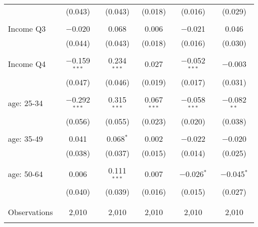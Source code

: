 \begin{tabular}{@{\extracolsep{5pt}}lccccc}
  & (0.043) & (0.043) & (0.018) & (0.016) & (0.029) \\ 
  & & & & & \\ 
 Income Q3 & $-$0.020 & 0.068 & 0.006 & $-$0.021 & 0.046 \\ 
  & (0.044) & (0.043) & (0.018) & (0.016) & (0.030) \\ 
  & & & & & \\ 
 Income Q4 & $-$0.159$^{***}$ & 0.234$^{***}$ & 0.027 & $-$0.052$^{***}$ & $-$0.003 \\ 
  & (0.047) & (0.046) & (0.019) & (0.017) & (0.031) \\ 
  & & & & & \\ 
 age: 25-34 & $-$0.292$^{***}$ & 0.315$^{***}$ & 0.067$^{***}$ & $-$0.058$^{***}$ & $-$0.082$^{**}$ \\ 
  & (0.056) & (0.055) & (0.023) & (0.020) & (0.038) \\ 
  & & & & & \\ 
 age: 35-49 & 0.041 & 0.068$^{*}$ & 0.002 & $-$0.022 & $-$0.020 \\ 
  & (0.038) & (0.037) & (0.015) & (0.014) & (0.025) \\ 
  & & & & & \\ 
 age: 50-64 & 0.006 & 0.111$^{***}$ & 0.007 & $-$0.026$^{*}$ & $-$0.045$^{*}$ \\ 
  & (0.040) & (0.039) & (0.016) & (0.015) & (0.027) \\ 
  & & & & & \\ 
\hline \\[-1.8ex] 

Observations & 2,010 & 2,010 & 2,010 & 2,010 & 2,010 \\ 
\hline 
\hline \\[-1.8ex] 
\end{tabular} 